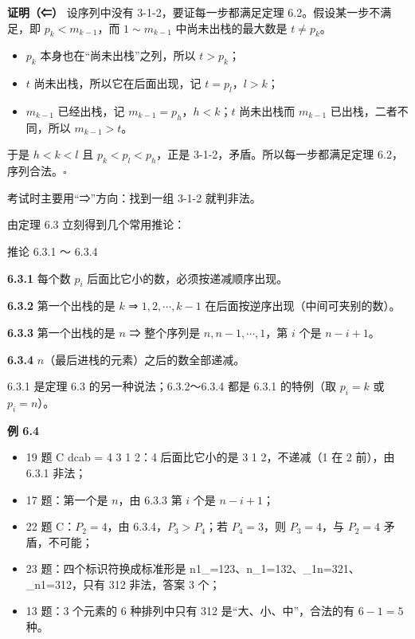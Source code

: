 \documentclass[10.5pt,a4paper,oneside]{article}
\providecommand{\tightlist}{\setlength{\itemsep}{2pt}\setlength{\parskip}{0pt}}
\begin{document}
\textbf{证明（⇐）} 设序列中没有 3-1-2，要证每一步都满足定理
6.2。假设某一步不满足，即 \(p_k<m_{k-1}\)，而 \(1\sim m_{k-1}\)
中尚未出栈的最大数是 \(t\ne p_k\)。

\begin{itemize}
\tightlist
\item
  \(p_k\) 本身也在“尚未出栈”之列，所以 \(t>p_k\)；
\item
  \(t\) 尚未出栈，所以它在后面出现，记 \(t=p_l\)，\(l>k\)；
\item
  \(m_{k-1}\) 已经出栈，记 \(m_{k-1}=p_h\)，\(h<k\)；\(t\) 尚未出栈而
  \(m_{k-1}\) 已出栈，二者不同，所以 \(m_{k-1}>t\)。
\end{itemize}

于是 \(h<k<l\) 且 \(p_k<p_l<p_h\)，正是
3-1-2，矛盾。所以每一步都满足定理 6.2，序列合法。\(\square\)

考试时主要用“⇒”方向：找到一组 3-1-2 就判非法。

由定理 6.3 立刻得到几个常用推论：

\begin{thmbox}{推论 6.3.1 ～ 6.3.4}

\textbf{6.3.1} 每个数 \(p_i\) 后面比它小的数，必须按递减顺序出现。

\textbf{6.3.2} 第一个出栈的是 \(k\) ⇒ \(1,2,\cdots,k-1\)
在后面按逆序出现（中间可夹别的数）。

\textbf{6.3.3} 第一个出栈的是 \(n\) ⇒ 整个序列是 \(n,n-1,\cdots,1\)，第
\(i\) 个是 \(n-i+1\)。

\textbf{6.3.4} \(n\)（最后进栈的元素）之后的数全部递减。

\end{thmbox}

6.3.1 是定理 6.3 的另一种说法；6.3.2～6.3.4 都是 6.3.1 的特例（取
\(p_i=k\) 或 \(p_i=n\)）。

\textbf{例 6.4}

\begin{itemize}
\tightlist
\item
  19 题 C dcab = 4 3 1 2：4 后面比它小的是 3 1 2，不递减（1 在 2
  前），由 6.3.1 非法；
\item
  17 题：第一个是 \(n\)，由 6.3.3 第 \(i\) 个是 \(n-i+1\)；
\item
  22 题 C：\(P_2=4\)，由 6.3.4，\(P_3>P_4\)；若 \(P_4=3\)，则
  \(P_3=4\)，与 \(P_2=4\) 矛盾，不可能；
\item
  23 题：四个标识符换成标准形是
  n1\_=123、n\_1=132、\_1n=321、\_n1=312，只有 312 非法，答案 3 个；
\item
  13 题：3 个元素的 6 种排列中只有 312 是“大、小、中”，合法的有
  \(6-1=5\) 种。
\end{itemize}
\end{document}
